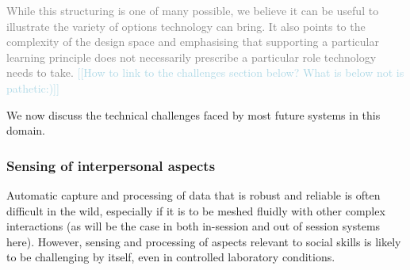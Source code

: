 \documentclass[prodmode,acmtochi]{acmsmall}
\newcommand{\todo}[1]{\textrm{\textrm{\textcolor{LightBlue}{[[#1]]}}}}
\newcommand{\rephrase}[1]{\textrm{\textrm{\textcolor{gray}{#1}}}}
\begin{document}
        
 \rephrase{While this structuring is one of many possible, we believe it can be useful to illustrate the variety of options technology can bring. It also points to the complexity of the design space and emphasising that supporting a particular learning principle does not necessarily prescribe a particular role technology needs to take.} 
\todo{How to link to the challenges section below? What is below not is pathetic:)}

We now discuss the technical challenges faced by most future systems in this domain. 


\fi




\subsubsection{Sensing of interpersonal aspects} Automatic capture and processing of data that is robust and reliable is often difficult in the wild, especially if it is to be meshed fluidly with other complex interactions (as will be the case in both in-session and out of session systems here). However, sensing and processing of aspects relevant to social skills is likely to be challenging by itself, even in controlled laboratory conditions.
\end{document}
